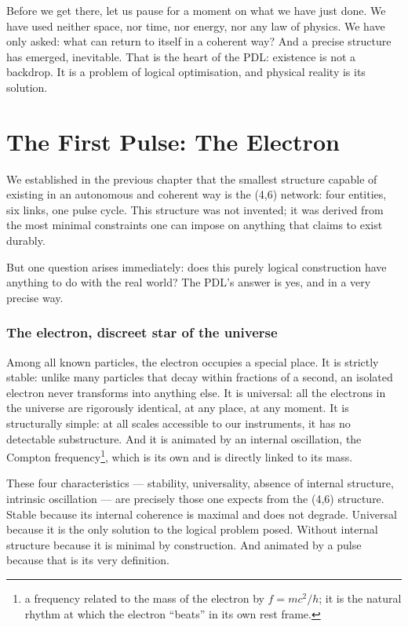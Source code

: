 \documentclass[11pt, a4paper, openright]{book}
\begin{document}
\medskip

Before we get there, let us pause for a moment on what we have just done. We have used neither space, nor time, nor energy, nor any law of physics. We have only asked: what can return to itself in a coherent way? And a precise structure has emerged, inevitable. That is the heart of the PDL: existence is not a backdrop. It is a problem of logical optimisation, and physical reality is its solution.

\chapter{The First Pulse: The Electron}

We established in the previous chapter that the smallest structure capable of existing in an autonomous and coherent way is the (4,6) network: four entities, six links, one pulse cycle. This structure was not invented; it was derived from the most minimal constraints one can impose on anything that claims to exist durably.

\medskip

But one question arises immediately: does this purely logical construction have anything to do with the real world? The PDL’s answer is yes, and in a very precise way.

\subsection*{The electron, discreet star of the universe}

Among all known particles, the electron occupies a special place. It is strictly stable: unlike many particles that decay within fractions of a second, an isolated electron never transforms into anything else. It is universal: all the electrons in the universe are rigorously identical, at any place, at any moment. It is structurally simple: at all scales accessible to our instruments, it has no detectable substructure. And it is animated by an internal oscillation, the Compton frequency\footnote{a frequency related to the mass of the electron by $f = mc^2/h$; it is the natural rhythm at which the electron “beats” in its own rest frame.}, which is its own and is directly linked to its mass.

\medskip

These four characteristics — stability, universality, absence of internal structure, intrinsic oscillation — are precisely those one expects from the (4,6) structure. Stable because its internal coherence is maximal and does not degrade. Universal because it is the only solution to the logical problem posed. Without internal structure because it is minimal by construction. And animated by a pulse because that is its very definition.
\end{document}
